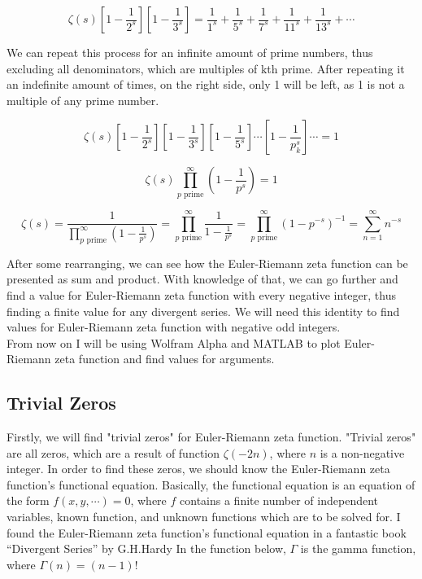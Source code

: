 \documentclass[a4paper]{article}
\begin{document}
\begin{equation*}
  \zeta(s)[1-\frac{1}{2^s}][1-\frac{1}{3^s}] = \frac{1}{1^s}+\frac{1}{5^s}+\frac{1}{7^s}+
  \frac{1}{11^s}+\frac{1}{13^s}+\cdots
  \end{equation*}

We can repeat this process for an infinite amount of prime numbers, thus
excluding all denominators, which are multiples of kth prime. After repeating it
an indefinite amount of times, on the right side, only 1 will be left, as 1 is
not a multiple of any prime number. 

\begin{equation*}
  \zeta(s)[1-\frac{1}{2^s}][1-\frac{1}{3^s}][1-\frac{1}{5^s}]\cdots[1-\frac{1}{p_k^s}]\cdots=1
  \end{equation*}

\begin{equation*}
    \zeta(s)\prod_{p \text{ prime}}^{\infty} (1-\frac{1}{p^s})=1
\end{equation*}

\begin{equation*}
  \zeta(s)=\frac{1}{\prod_{p \text{ prime}}^{\infty} (1-\frac{1}{p^s})}=\prod_{p \text{ prime}}^{\infty} \frac{1}{1-\frac{1}{p^s}}=
  \prod_{p \text{ prime}}^{\infty} (1-p^{-s})^{-1}=\sum_{n=1}^{\infty} n^{-s}
  \end{equation*}

After some rearranging, we can see how the Euler-Riemann zeta function can be
presented as sum and product. With knowledge of that, we can go further and find
a value for Euler-Riemann zeta function with every negative integer, thus
finding a finite value for any divergent series. We will need this identity to
find values for Euler-Riemann zeta function with negative odd integers.\\

From now on I will be using Wolfram Alpha and MATLAB to plot Euler-Riemann zeta
function and find values for arguments.\\

\subsection{Trivial Zeros}
\label{sec:org1026a52}

Firstly, we will find "trivial zeros" for Euler-Riemann zeta function. "Trivial
zeros" are all zeros, which are a result of function \(\zeta(-2n)\), where \(n\) is
a non-negative integer. In order to find these zeros, we should know the
Euler-Riemann zeta function's functional equation. Basically, the functional
equation \cite{Func} is an equation of the form \(f(x, y, \cdots ) = 0\), where \(f\)
contains a finite number of independent variables, known function, and unknown
functions which are to be solved for. I found the Euler-Riemann zeta function's
functional equation in a fantastic book “Divergent Series” by
G.H.Hardy \cite{Hardy} In the function below, \(\Gamma\) is the gamma function,
where \(\Gamma(n) = (n-1)!\) 
\end{document}
